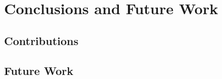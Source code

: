 \chapter{Conclusions and Future Work}
\label{chap:conclusion}


\section{Contributions} 
\label{sec:conclusion_contributions}


%	
%	
%	
%	
%	
%		
	

\section{Future Work}
\label{sec:conclusion_future_work}

